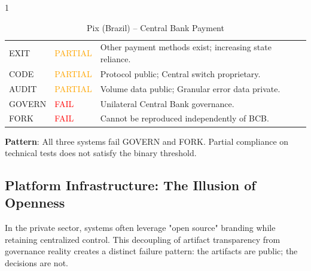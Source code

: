 \begin{table}[htbp]
    \begin{subtable}{1\textwidth}
        \centering
        \caption{Pix (Brazil) -- Central Bank Payment}
        \small
        \begin{tabular}{@{}llp{8.5cm}@{}}
            \toprule
            EXIT & \textcolor{orange}{PARTIAL} & Other payment methods exist; increasing state reliance. \\
            CODE & \textcolor{orange}{PARTIAL} & Protocol public; Central switch proprietary. \\
            AUDIT & \textcolor{orange}{PARTIAL} & Volume data public; Granular error data private. \\
            GOVERN & \textcolor{red}{FAIL} & Unilateral Central Bank governance. \\
            FORK & \textcolor{red}{FAIL} & Cannot be reproduced independently of BCB. \\
            \bottomrule
        \end{tabular}
    \end{subtable}
\end{table}

\textbf{Pattern}: All three systems fail GOVERN and FORK. Partial compliance on technical tests does not satisfy the binary threshold.

\subsection{Platform Infrastructure: The Illusion of Openness}

In the private sector, systems often leverage "open source" branding while retaining centralized control. This decoupling of artifact transparency from governance reality creates a distinct failure pattern: the artifacts are public; the decisions are not.

